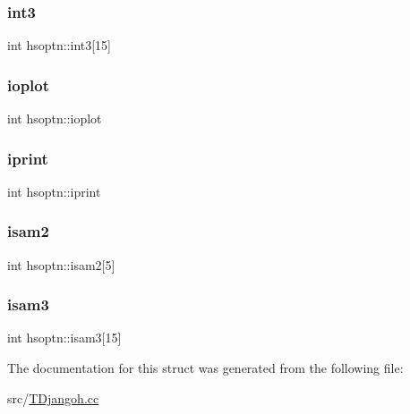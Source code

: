 \mbox{\label{structhsoptn_aad52dcd6b5df74e9db164a44c7c3d001}} 
\subsubsection{\texorpdfstring{int3}{int3}}
{\footnotesize\ttfamily int hsoptn\+::int3\mbox{[}15\mbox{]}}

\mbox{\label{structhsoptn_a0b5585fb41fe026d95451bfc65e956a0}} 
\subsubsection{\texorpdfstring{ioplot}{ioplot}}
{\footnotesize\ttfamily int hsoptn\+::ioplot}

\mbox{\label{structhsoptn_a09ad05633ee63e8919e70ce554f7d160}} 
\subsubsection{\texorpdfstring{iprint}{iprint}}
{\footnotesize\ttfamily int hsoptn\+::iprint}

\mbox{\label{structhsoptn_ab859afeb8909136551c464c4cde1f37e}} 
\subsubsection{\texorpdfstring{isam2}{isam2}}
{\footnotesize\ttfamily int hsoptn\+::isam2\mbox{[}5\mbox{]}}

\mbox{\label{structhsoptn_a31ff1c9d49ed6b3a1cffca02a50c08c9}} 
\subsubsection{\texorpdfstring{isam3}{isam3}}
{\footnotesize\ttfamily int hsoptn\+::isam3\mbox{[}15\mbox{]}}



The documentation for this struct was generated from the following file\+:\begin{DoxyCompactItemize}
\item 
src/\hyperlink{_t_djangoh_8cc}{T\+Djangoh.\+cc}\end{DoxyCompactItemize}
